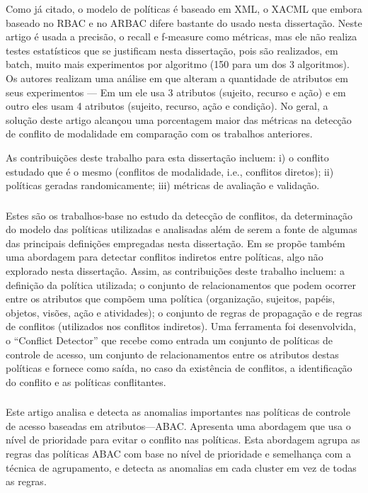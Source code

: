 Como já citado, o modelo de políticas é baseado em XML, o XACML que embora baseado no RBAC e no ARBAC difere bastante do usado nesta dissertação. Neste artigo é usada a precisão, o recall e f-measure como métricas, mas ele não realiza testes estatísticos que se justificam nesta dissertação, pois são realizados, em batch, muito mais experimentos por algoritmo (150 para um dos 3 algoritmos). Os autores realizam uma análise em que alteram a quantidade de atributos em seus experimentos --- Em um ele usa 3 atributos (sujeito, recurso e ação) e em outro eles usam 4 atributos (sujeito, recurso, ação e condição). No geral, a solução deste artigo alcançou uma porcentagem maior das métricas na detecção de conflito de modalidade em comparação com os trabalhos anteriores.

As contribuições deste trabalho para esta dissertação incluem: i) o conflito estudado que é o mesmo (conflitos de modalidade, i.e., conflitos diretos); ii) políticas geradas randomicamente; iii) métricas de avaliação e validação. 

\subsubsection{ }
Estes são os trabalhos-base no estudo da detecção de conflitos, da determinação do modelo das políticas utilizadas e analisadas além de serem a fonte de algumas das principais definições empregadas nesta dissertação. Em  se propõe também uma abordagem para detectar conflitos indiretos entre políticas, algo não explorado nesta dissertação. Assim, as contribuições deste trabalho incluem: a definição da política utilizada; o conjunto de relacionamentos que podem ocorrer entre os atributos que compõem uma política (organização, sujeitos, papéis, objetos, visões, ação e atividades); o conjunto de regras de propagação e de regras de conflitos (utilizados nos conflitos indiretos). Uma ferramenta foi desenvolvida, o  ``Conflict Detector'' que recebe como entrada um conjunto de políticas de controle de acesso, um conjunto de relacionamentos entre os atributos destas políticas e fornece como saída, no caso da existência de conflitos, a identificação do conflito e as políticas conflitantes.

\subsubsection{ }
Este artigo analisa e detecta as anomalias importantes nas políticas de controle de acesso baseadas em atributos---ABAC. Apresenta uma abordagem que usa o nível de prioridade para evitar o conflito nas políticas. Esta abordagem agrupa as regras das políticas ABAC com base no nível de prioridade e semelhança com a técnica de agrupamento, e detecta as anomalias em cada cluster em vez de todas as regras.

